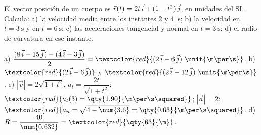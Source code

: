 \begin{exercise}
    El vector posición de un cuerpo es \(\vec r(t) = 2t\,\vec{i} + (1 - t^2)\,\vec{j}\), en unidades del SI. Calcula: a) la velocidad media
    entre los instantes 2 y \qty{4}{\s}; b) la velocidad en \(t = \qty{3}{\s}\) y en \(t = \qty{6}{\s}\); c) las aceleraciones
    tangencial y normal en \(t = \qty{3}{\s}\); d) el radio de curvatura en ese instante.
    \begin{solu}
        a) \(\dfrac{(8\,\ivec - 15\,\jvec) - (4\,\ivec - 3\,\jvec)}{2} = \textcolor{red}{(2\,\ivec - 6\,\jvec)~\unit{\m\per\s}}\).
        b) \(\textcolor{red}{(2\,\ivec - 6\,\jvec)}\) y \(\textcolor{red}{(2\,\ivec - 12\,\jvec)~\unit{\m\per\s}}\).
        c) \(|\vec v| = 2\sqrt{1 + t^2}\), \(a_t = \dfrac{2t}{\sqrt{1 + t^2}}\): \(\textcolor{red}{a_t(3) = \qty{1.90}{\m\per\s\squared}}\);
        \(|\vec a| = 2\): \(\textcolor{red}{a_n = \sqrt{4 - \num{3.6}} = \qty{0.63}{\m\per\s\squared}}\).
        d) \(R = \dfrac{40}{\num{0.632}} = \textcolor{red}{\qty{63}{\m}}\).
    \end{solu}
\end{exercise}
